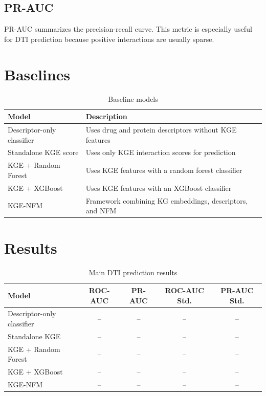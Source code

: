 \subsection{PR-AUC}

PR-AUC summarizes the precision-recall curve. This metric is especially useful
for DTI prediction because positive interactions are usually sparse.

\section{Baselines}


\begin{table}[H]
\centering
\caption{Baseline models}
\label{tab:baseline_models}
\begin{tabularx}{\textwidth}{lX}
\toprule
\textbf{Model} & \textbf{Description} \\
\midrule
Descriptor-only classifier & Uses drug and protein descriptors without KGE features \\
Standalone KGE score & Uses only KGE interaction scores for prediction \\
KGE + Random Forest & Uses KGE features with a random forest classifier \\
KGE + XGBoost & Uses KGE features with an XGBoost classifier \\
KGE-NFM & Framework combining KG embeddings, descriptors, and NFM \\
\bottomrule
\end{tabularx}
\end{table}

\section{Results}


\begin{table}[H]
\centering
\caption{Main DTI prediction results}
\label{tab:main_results}
\begin{tabular}{lcccc}
\toprule
\textbf{Model} & \textbf{ROC-AUC} & \textbf{PR-AUC} &
\textbf{ROC-AUC Std.} & \textbf{PR-AUC Std.} \\
\midrule
Descriptor-only classifier & -- & -- & -- & -- \\
Standalone KGE & -- & -- & -- & -- \\
KGE + Random Forest & -- & -- & -- & -- \\
KGE + XGBoost & -- & -- & -- & -- \\
KGE-NFM & -- & -- & -- & -- \\
\bottomrule
\end{tabular}
\end{table}

